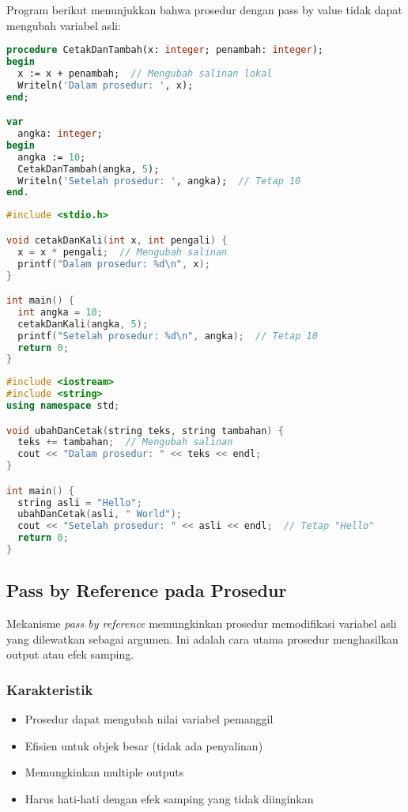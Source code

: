 \documentclass[../main.tex]{subfiles}
\begin{document}
Program berikut menunjukkan bahwa prosedur dengan pass by value tidak dapat mengubah variabel asli:

\begin{lstlisting}[language=Pascal, caption={Pass by value pada prosedur (Pascal)}]
procedure CetakDanTambah(x: integer; penambah: integer);
begin
  x := x + penambah;  // Mengubah salinan lokal
  Writeln('Dalam prosedur: ', x);
end;

var
  angka: integer;
begin
  angka := 10;
  CetakDanTambah(angka, 5);
  Writeln('Setelah prosedur: ', angka);  // Tetap 10
end.
\end{lstlisting}

\begin{lstlisting}[language=C, caption={Pass by value pada prosedur (C)}]
#include <stdio.h>

void cetakDanKali(int x, int pengali) {
  x = x * pengali;  // Mengubah salinan
  printf("Dalam prosedur: %d\n", x);
}

int main() {
  int angka = 10;
  cetakDanKali(angka, 5);
  printf("Setelah prosedur: %d\n", angka);  // Tetap 10
  return 0;
}
\end{lstlisting}

\begin{lstlisting}[language=C++, caption={Pass by value pada prosedur (C++)}]
#include <iostream>
#include <string>
using namespace std;

void ubahDanCetak(string teks, string tambahan) {
  teks += tambahan;  // Mengubah salinan
  cout << "Dalam prosedur: " << teks << endl;
}

int main() {
  string asli = "Hello";
  ubahDanCetak(asli, " World");
  cout << "Setelah prosedur: " << asli << endl;  // Tetap "Hello"
  return 0;
}
\end{lstlisting}

\subsection{Pass by Reference pada Prosedur}
Mekanisme \emph{pass by reference} memungkinkan prosedur memodifikasi variabel asli yang dilewatkan sebagai argumen. Ini adalah cara utama prosedur menghasilkan output atau efek samping.

\subsubsection{Karakteristik}
\begin{itemize}
  \item Prosedur dapat mengubah nilai variabel pemanggil
  \item Efisien untuk objek besar (tidak ada penyalinan)
  \item Memungkinkan multiple outputs
  \item Harus hati-hati dengan efek samping yang tidak diinginkan
\end{itemize}
\end{document}

